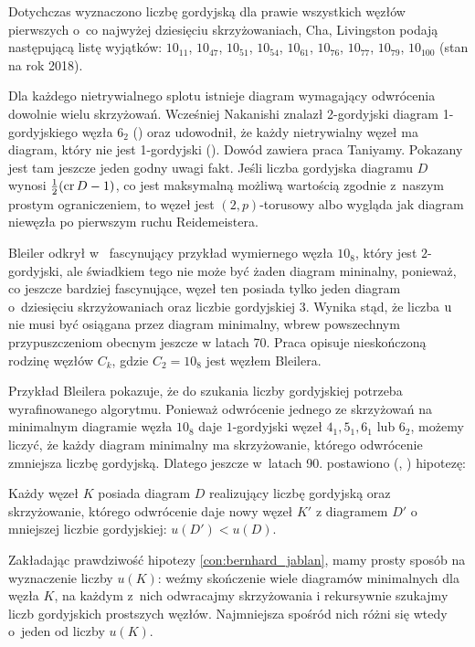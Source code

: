 Dotychczas wyznaczono liczbę gordyjską dla prawie wszystkich węzłów pierwszych o~co najwyżej dziesięciu skrzyżowaniach,
Cha, Livingston \cite{cha18} podają następującą listę wyjątków:
$10_{11}$, $10_{47}$, $10_{51}$, $10_{54}$, $10_{61}$, $10_{76}$, $10_{77}$, $10_{79}$, $10_{100}$ (stan na rok 2018).

Dla każdego nietrywialnego splotu istnieje diagram wymagający odwrócenia dowolnie wielu skrzyżowań.
Wcześniej Nakanishi znalazł 2-gordyjski diagram 1-gordyjskiego węzła $6_2$ (\cite{nakanishi83}) oraz udowodnił, że każdy nietrywialny węzeł ma diagram, który nie jest 1-gordyjski (\cite{nakanishi96}).
Dowód zawiera praca \cite{taniyama09} Taniyamy.
Pokazany jest tam jeszcze jeden godny uwagi fakt.
Jeśli liczba gordyjska diagramu $D$ wynosi $\frac 12 (\operatorname{cr} D - 1)$, co jest maksymalną możliwą wartością zgodnie z~naszym prostym ograniczeniem,
to węzeł jest $(2,p)$-torusowy albo wygląda jak diagram niewęzła po pierwszym ruchu Reidemeistera.

Bleiler odkrył w~\cite{bleiler84} fascynujący przykład wymiernego węzła $10_8$, który jest $2$-gordyjski, ale świadkiem tego nie może być żaden diagram mininalny, ponieważ, co jeszcze bardziej fascynujące, węzeł ten posiada tylko jeden diagram o~dziesięciu skrzyżowaniach oraz liczbie gordyjskiej 3.
Wynika stąd, że liczba $\operatorname{u}$ nie musi być osiągana przez diagram minimalny, wbrew powszechnym przypuszczeniom obecnym jeszcze w latach 70.
Praca \cite{bernhard94} opisuje nieskończoną rodzinę węzłów $C_k$, gdzie $C_2 = 10_8$ jest węzłem Bleilera.

Przykład Bleilera pokazuje, że do szukania liczby gordyjskiej potrzeba wyrafinowanego algorytmu.
Ponieważ odwrócenie jednego ze skrzyżowań na minimalnym diagramie węzła $10_8$ daje $1$-gordyjski węzeł $4_1, 5_1, 6_1$ lub $6_2$, możemy liczyć, że każdy diagram minimalny ma skrzyżowanie, którego odwrócenie zmniejsza liczbę gordyjską.
Dlatego jeszcze w~latach 90. postawiono (\cite{bernhard94}, \cite{jablan98}) hipotezę:

\begin{conjecture}
%
\label{con:bernhard_jablan}%
    Każdy węzeł $K$ posiada diagram $D$ realizujący liczbę gordyjską oraz skrzyżowanie, którego odwrócenie daje nowy węzeł $K'$ z diagramem $D'$ o mniejszej liczbie gordyjskiej: $u(D') < u(D)$.
\end{conjecture}

Zakładając prawdziwość hipotezy \ref{con:bernhard_jablan}, mamy prosty sposób na wyznaczenie liczby $u(K)$: weźmy skończenie wiele diagramów minimalnych dla węzła $K$, na każdym z~nich odwracajmy skrzyżowania i rekursywnie szukajmy liczb gordyjskich prostszych węzłów.
Najmniejsza spośród nich różni się wtedy o~jeden od liczby $u(K)$.

